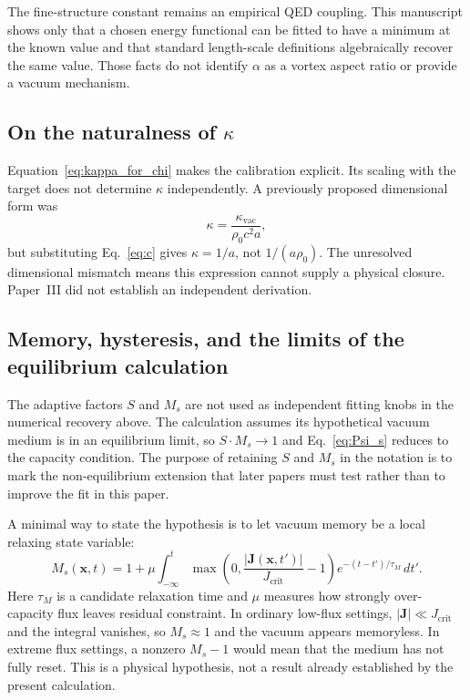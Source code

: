 \documentclass[11pt]{article}
\begin{document}
The fine-structure constant remains an empirical QED coupling. This manuscript
shows only that a chosen energy functional can be fitted to have a minimum at
the known value and that standard length-scale definitions algebraically recover
the same value. Those facts do not identify $\alpha$ as a vortex aspect ratio or
provide a vacuum mechanism.

\subsection{On the naturalness of $\kappa$}

Equation~\eqref{eq:kappa_for_chi} makes the calibration explicit. Its scaling
with the target does not determine $\kappa$ independently. A previously proposed
dimensional form was
\begin{equation}
  \kappa = \frac{\kappa_\text{vac}}{\rho_0 c^2 a},
  \label{eq:kappa_dim}
\end{equation}
but substituting Eq.~\eqref{eq:c} gives $\kappa=1/a$, not $1/(a\rho_0)$.
The unresolved dimensional mismatch means this expression cannot supply a
physical closure. Paper~III did not establish an independent derivation.

\subsection{Memory, hysteresis, and the limits of the equilibrium calculation}

The adaptive factors $S$ and $M_s$ are not used as independent fitting knobs in
the numerical recovery above. The calculation assumes its hypothetical vacuum
medium is in an equilibrium limit, so $S\cdot M_s\rightarrow1$ and
Eq.~\eqref{eq:Psi_s} reduces to the capacity condition. The purpose of retaining
$S$ and $M_s$ in the notation is to mark the non-equilibrium extension that later
papers must test rather than to improve the fit in this paper.

A minimal way to state the hypothesis is to let vacuum memory be a local
relaxing state variable:
\begin{equation}
  M_s(\bm{x},t)
  =
  1+\mu\int_{-\infty}^{t}
  \max\!\left(0,\frac{|\bm{J}(\bm{x},t')|}{J_\text{crit}}-1\right)
  e^{-(t-t')/\tau_M}\,dt'.
  \label{eq:memory_kernel}
\end{equation}
Here $\tau_M$ is a candidate relaxation time and $\mu$ measures how strongly
over-capacity flux leaves residual constraint. In ordinary low-flux settings,
$|\bm{J}|\ll J_\text{crit}$ and the integral vanishes, so $M_s\approx1$ and the
vacuum appears memoryless. In extreme flux settings, a nonzero $M_s-1$ would mean
that the medium has not fully reset. This is a physical hypothesis, not a result
already established by the present calculation.
\end{document}
